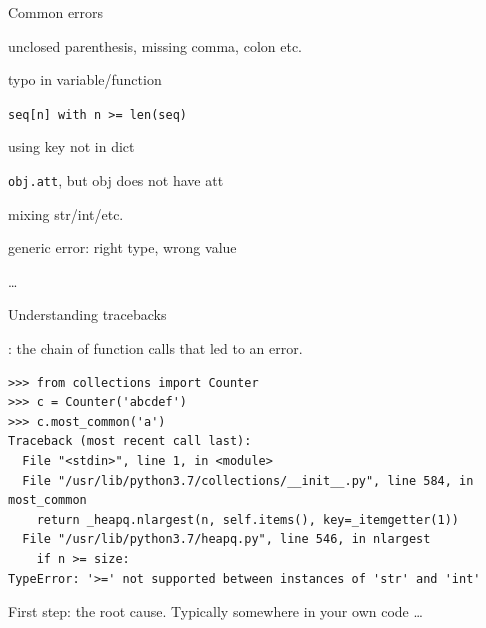 \documentclass[aspectratio=169,usenames,dvipsnames]{beamer}
\begin{document}
\begin{frame}{Common errors}
    \begin{description}[AttributeError]
        \item[SyntaxError] unclosed parenthesis, missing comma, colon etc.
        \item[NameError] typo in variable/function
        \item[IndexError] \texttt{seq[n] with n >= len(seq)}
        \item[KeyError] using key not in dict
        \item[AttributeError] \texttt{obj.att}, but obj does not have att
        \item[TypeError] mixing str/int/etc.
        \item[ValueError] generic error: right type, wrong value
        \item[\dots] \dots
    \end{description}
\end{frame}

\begin{frame}[fragile]{Understanding tracebacks}
\begin{definition}
    : the chain of function calls that led to an error.
\end{definition}
\begin{lstlisting}
>>> from collections import Counter
>>> c = Counter('abcdef')
>>> c.most_common('a')
Traceback (most recent call last):
  File "<stdin>", line 1, in <module>
  File "/usr/lib/python3.7/collections/__init__.py", line 584, in most_common
    return _heapq.nlargest(n, self.items(), key=_itemgetter(1))
  File "/usr/lib/python3.7/heapq.py", line 546, in nlargest
    if n >= size:
TypeError: '>=' not supported between instances of 'str' and 'int'
\end{lstlisting}
\pause
First step:  the root cause.
Typically somewhere in your own code \dots
\end{frame}
\end{document}
